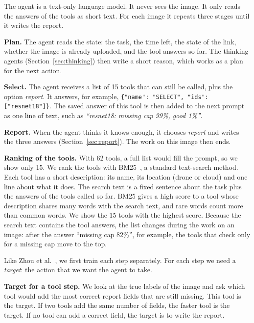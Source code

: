 \documentclass[final,5p,times,twocolumn]{elsarticle}
\makeatletter
\renewcommand\subsection{\@startsection{subsection}{2}{\z@}{-12pt plus -2pt minus -2pt}{6pt}{\normalfont\normalsize\itshape}}
\makeatother
\begin{document}
The agent is a text-only language model. It never sees the image. It only reads the answers of the tools as short text. For each image it repeats three stages until it writes the report.

\textbf{Plan.} The agent reads the state: the task, the time left, the state of the link, whether the image is already uploaded, and the tool answers so far. The thinking agents (Section~\ref{sec:thinking}) then write a short reason, which works as a plan for the next action.

\textbf{Select.} The agent receives a list of 15 tools that can still be called, plus the option \emph{report}. It answers, for example, \texttt{\{"name": "SELECT", "ids": ["resnet18"]\}}. The saved answer of this tool is then added to the next prompt as one line of text, such as \emph{``resnet18: missing cap 99\%, good 1\%''}.

\textbf{Report.} When the agent thinks it knows enough, it chooses \emph{report} and writes the three answers (Section~\ref{sec:report}). The work on this image then ends.

\textbf{Ranking of the tools.} With 62 tools, a full list would fill the prompt, so we show only 15. We rank the tools with BM25~\cite{bm25}, a standard text-search method. Each tool has a short description: its name, its location (drone or cloud) and one line about what it does. The search text is a fixed sentence about the task plus the answers of the tools called so far. BM25 gives a high score to a tool whose description shares many words with the search text, and rare words count more than common words. We show the 15 tools with the highest score. Because the search text contains the tool answers, the list changes during the work on an image: after the answer ``missing cap 82\%'', for example, the tools that check only for a missing cap move to the top.

\subsection{Training with SFT}
\label{sec:targets}

Like Zhou et al.~\cite{zhou2026}, we first train each step separately. For each step we need a \emph{target}: the action that we want the agent to take.

\textbf{Target for a tool step.} We look at the true labels of the image and ask which tool would add the most correct report fields that are still missing. This tool is the target. If two tools add the same number of fields, the faster tool is the target. If no tool can add a correct field, the target is to write the report.
\end{document}

